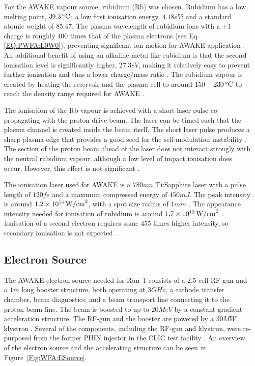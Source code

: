 For the AWAKE vapour source, rubidium (Rb) was chosen.
Rubidium has a low melting point, $39.3\celsius$; a low first ionisation energy, $4.18\unit{eV}$; and a standard atomic weight of $85.47$.
The plasma wavelength of rubidium ions with a $+1$ charge is roughly $400$ times that of the plasma electrons (see Eq. \ref{EQ:PWFA:L0W0}), preventing significant ion motion for AWAKE application \cite{vieira:2012a}.
An additional benefit of using an alkaline metal like rubidium is that the second ionisation level is significantly higher, $27.3\unit{eV}$, making it relatively easy to prevent further ionisation and thus a lower charge/mass ratio \cite{awake_collaboration:2017}.
The rubidium vapour is created by heating the reservoir and the plasma cell to around $150-230\celsius$ to reach the density range required for AWAKE \cite{caldwell:2015,muggli:2017a}.

The ionisation of the Rb vapour is achieved with a short laser pulse co-propagating with the proton drive beam.
The laser can be timed such that the plasma channel is created inside the beam itself.
The short laser pulse produces a sharp plasma edge that provides a good seed for the self-modulation instability \cite{vieira:2014a}.
The section of the proton beam ahead of the laser does not interact strongly with the neutral rubidium vapour, although a low level of impact ionisation does occur.
However, this effect is not significant \cite{awake_collaboration:2017}.

The ionisation laser used for AWAKE is a $780\unit{nm}$ Ti:Sapphire laser with a pulse length of $120\unit{fs}$ and a maximum compressed energy of $450\unit{mJ}$.
The peak intensity is around $1.2\nexp{14}\unit{W/cm}^{2}$, with a spot size radius of $1\unit{mm}$ \cite{awake_collaboration:2017}.
The appearance intensity needed for ionisation of rubidium is around $1.7\nexp{12}\unit{W/cm}^{2}$ \cite{augst:1989}.
Ionisation of a second electron requires some $455$ times higher intensity, so secondary ionisation is not expected \cite{muggli:2017a}.


\subsection{Electron Source}
\label{WFA:Design:ESource}

The AWAKE electron source needed for Run~1 consists of a $2.5$ cell RF-gun and a $1\unit{m}$ long booster structure, both operating at $3\unit{GHz}$, a cathode transfer chamber, beam diagnostics, and a beam transport line connecting it to the proton beam line.
The beam is boosted to up to $20\unit{MeV}$ by a constant gradient acceleration structure.
The RF-gun and the booster are powered by a $30\unit{MW}$ klystron \cite{awake_collaboration:2017,pepitone:2016}.
Several of the components, including the RF-gun and klystron, were re-purposed from the former PHIN injector in the CLIC test facility \cite{chevallay:2012}.
An overview of the electron source and the accelerating structure can be seen in Figure~\ref{Fig:WFA:ESource}.

